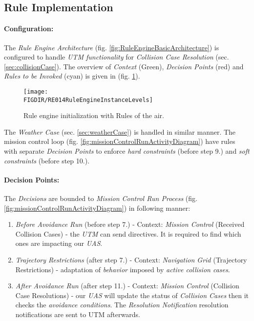 \subsection{Rule Implementation}\label{sec:ruleImplementation}

\paragraph{Configuration:} The \emph{Rule Engine Architecture} (fig. \ref{fig:RuleEngineBasicArchitecture}) is configured to handle \emph{UTM functionality} for \emph{Collision Case Resolution} (sec. \ref{sec:collisionCase}).  The overview of \emph{Context} (Green), \emph{Decision Points} (red) and \emph{Rules to be Invoked} (cyan) is given in (fig. \ref{fig:RuleEngineInstanceLevels}). 

\begin{figure}[H]
    \centering
    \texttt{[image: \\FIGDIR/RE014RuleEngineInstanceLevels]} 
    \caption{Rule engine initialization with Rules of the air.}
    \label{fig:RuleEngineInstanceLevels}
\end{figure}

\begin{note}
    The \emph{Weather Case} (sec. \ref{sec:weatherCase}) is handled in similar manner. The mission control loop (fig. \ref{fig:missionControlRunActivityDiagram}) have rules with separate \emph{Decision Points} to enforce \emph{hard constraints} (before step 9.) and \emph{soft constraints} (before step 10.).
\end{note}


\paragraph{Decision Points:} The \emph{Decisions} are bounded to \emph{Mission Control Run Process} (fig. \ref{fig:missionControlRunActivityDiagram}) in following manner:
\begin{enumerate}
    \item \emph{Before Avoidance Run} (before step 7.) - Context: \emph{Mission Control} (Received Collision Cases) - the \emph{UTM} can send  directives. It is required to find which ones are impacting our \emph{UAS}.
    
    \item \emph{Trajectory Restrictions} (after step 7.) - Context: \emph{Navigation Grid} (Trajectory Restrictions) - adaptation of \emph{behavior} imposed by \emph{active collision cases}.
    
    \item \emph{After Avoidance Run} (after step 11.) - Context: \emph{Mission Control} (Collision Case Resolutions) - our \emph{UAS} will update the status of \emph{Collision Cases} then it checks the \emph{avoidance conditions}. The \emph{Resolution Notification} resolution notifications are sent to UTM afterwards.
    
\end{enumerate}

